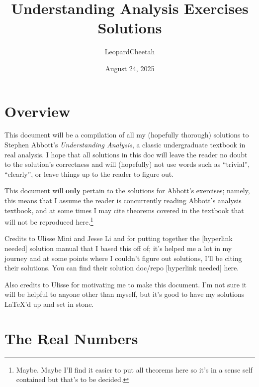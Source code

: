 \documentclass[12pt]{article}
\title{Understanding Analysis Exercises Solutions}
\author{LeopardCheetah}
\date{August 24, 2025}
\begin{document}
 
\maketitle
\newpage


\section*{Overview}

This document will be a compilation of all my (hopefully thorough) solutions to Stephen Abbott's \textit{Understanding Analysis}, a classic undergraduate textbook in real analysis. I hope that all solutions in this doc will leave the reader no doubt to the solution's correctness and will (hopefully) not use words such as ``trivial'', ``clearly'', or leave things up to the reader to figure out.

This document will \textbf{only} pertain to the solutions for Abbott's exercises; namely, this means that I assume the reader is concurrently reading Abbott's analysis textbook, and at some times I may cite theorems covered in the textbook that will not be reproduced here.\footnote{Maybe. Maybe I'll find it easier to put all theorems here so it's in a sense self contained but that's to be decided.}

Credits to Ulisse Mini and Jesse Li and for putting together the [hyperlink needed] solution manual that I based this off of; it's helped me a lot in my journey and at some points where I couldn't figure out solutions, I'll be citing their solutions. You can find their solution doc/repo [hyperlink needed] here.

Also credits to Ulisse for motivating me to make this document. I'm not sure it will be helpful to anyone other than myself, but it's good to have my solutions \LaTeX'd up and set in stone.

\newpage


\tableofcontents
\newpage 




\section{The Real Numbers}
\end{document}
